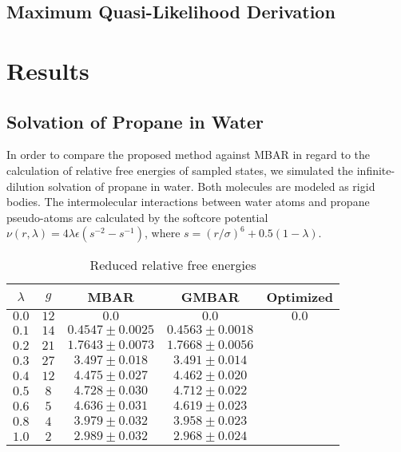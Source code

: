 \documentclass[aip,jcp,reprint,amsmath,amssymb]{revtex4-1}
\begin{document}
\subsection{Maximum Quasi-Likelihood Derivation}


\section{Results}

\subsection{Solvation of Propane in Water}

In order to compare the proposed method against MBAR in regard to the calculation of relative free energies of sampled states, we simulated the infinite-dilution solvation of propane in water. Both molecules are modeled as rigid bodies. The intermolecular interactions between water atoms and propane pseudo-atoms are calculated by the softcore potential\cite{Beutler_1994} $\nu(r,\lambda) = 4\lambda\epsilon(s^{-2} - s^{-1})$, where $s = (r/\sigma)^6 + 0.5 (1-\lambda)$.

\begin{table}
\caption{Reduced relative free energies}
\label{table:propane solvation}
\begin{ruledtabular}
\begin{tabular}{ccccc}
$\lambda$ & $g$ & MBAR & GMBAR & Optimized \\
\hline
$0.0$ & $12$ & $0.0$ & $0.0$ & $0.0$ \\
$0.1$ & $14$ & $0.4547 \pm 0.0025$ & $0.4563 \pm 0.0018$ \\
$0.2$ & $21$ & $1.7643 \pm 0.0073$ & $1.7668 \pm 0.0056$ \\
$0.3$ & $27$ &  $3.497 \pm 0.018$  &  $3.491 \pm 0.014$ \\
$0.4$ & $12$ &  $4.475 \pm 0.027$  &  $4.462 \pm 0.020$ \\
$0.5$ & $8$  &  $4.728 \pm 0.030$  &  $4.712 \pm 0.022$ \\
$0.6$ & $5$  &  $4.636 \pm 0.031$  &  $4.619 \pm 0.023$ \\
$0.8$ & $4$  &  $3.979 \pm 0.032$  &  $3.958 \pm 0.023$ \\
$1.0$ & $2$  &  $2.989 \pm 0.032$  &  $2.968 \pm 0.024$
\end{tabular}
\end{ruledtabular}
\end{table}
\end{document}
